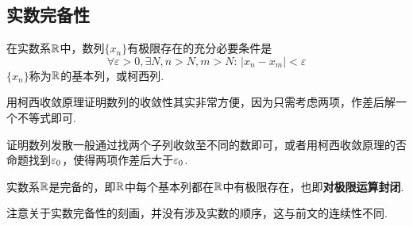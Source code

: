 \subsection{实数完备性}
\begin{theorem}
\label{thm:cauchy_convergence}
在实数系$\mathbb{R}$中，数列$\{x_n\}$有极限存在的充分必要条件是
\[\forall\varepsilon>0,\exists N,n>N,m>N:\,|x_n-x_m|<\varepsilon\]
$\{x_n\}$称为$\mathbb{R}$的基本列，或柯西列.
\end{theorem}
\par 用柯西收敛原理证明数列的收敛性其实非常方便，因为只需考虑两项，作差后解一个不等式即可.
\par 证明数列发散一般通过找两个子列收敛至不同的数即可，或者用柯西收敛原理的否命题找到$\varepsilon_0$，使得两项作差后大于$\varepsilon_0$.
\begin{theorem}
实数系$\mathbb{R}$是完备的，即$\mathbb{R}$中每个基本列都在$\mathbb{R}$中有极限存在，也即\textbf{对极限运算封闭}.
\end{theorem}
\par 注意关于实数完备性的刻画，并没有涉及实数的顺序，这与前文的连续性不同.